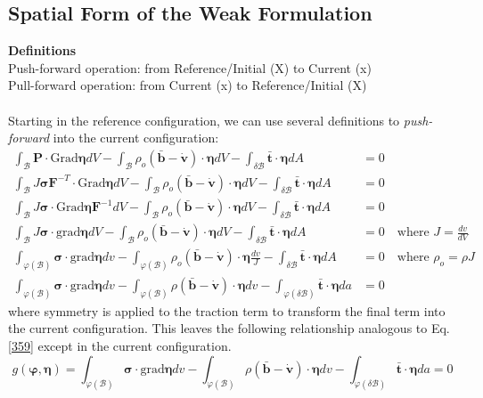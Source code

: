 \documentclass[12pt,3p]{article}
\numberwithin{equation}{section}
\begin{document}
\subsection{Spatial Form of the Weak Formulation}
\textbf{Definitions} \\ 
Push-forward operation: from Reference/Initial (X) to Current (x) \\
Pull-forward operation: from Current (x) to Reference/Initial (X) \\ \\
Starting in the reference configuration, we can use several definitions to \textit{push-forward} into the current configuration: 
\begin{align*}
\int_{\mathcal{B}} \mathbf{P} \cdot \text{Grad} \pmb{\eta} dV - \int_{\mathcal{B}} \rho_o (\mathbf{\bar{b}} - \mathbf{\dot{v}}) \cdot \pmb{\eta} dV - \int_{\delta \mathcal{B}} \mathbf{\bar{t}} \cdot \pmb{\eta} dA &= 0 \\
\int_{\mathcal{B}} J \pmb{\sigma} \mathbf{F}^{-T} \cdot \text{Grad} \pmb{\eta} dV - \int_{\mathcal{B}} \rho_o (\mathbf{\bar{b}} - \mathbf{\dot{v}}) \cdot \pmb{\eta} dV - \int_{\delta \mathcal{B}} \mathbf{\bar{t}} \cdot \pmb{\eta} dA &= 0 \\
\int_{\mathcal{B}} J \pmb{\sigma} \cdot \text{Grad} \pmb{\eta} \mathbf{F}^{-1} dV - \int_{\mathcal{B}} \rho_o (\mathbf{\bar{b}} - \mathbf{\dot{v}}) \cdot \pmb{\eta} dV - \int_{\delta \mathcal{B}} \mathbf{\bar{t}} \cdot \pmb{\eta} dA &= 0 \\
\int_{\mathcal{B}} J \pmb{\sigma} \cdot \text{grad} \pmb{\eta} dV - \int_{\mathcal{B}} \rho_o (\mathbf{\bar{b}} - \mathbf{\dot{v}}) \cdot \pmb{\eta} dV - \int_{\delta \mathcal{B}} \mathbf{\bar{t}} \cdot \pmb{\eta} dA &= 0 \quad \text{where } J = \frac{dv}{dV} \\
\int_{\varphi(\mathcal{B})} \pmb{\sigma} \cdot \text{grad} \pmb{\eta} dv - \int_{\varphi(\mathcal{B})} \rho_o (\mathbf{\bar{b}} - \mathbf{\dot{v}}) \cdot \pmb{\eta} \frac{dv}{J} - \int_{\delta \mathcal{B}} \mathbf{\bar{t}} \cdot \pmb{\eta} dA &= 0 \quad \text{where } \rho_o = \rho J \\
\int_{\varphi(\mathcal{B})} \pmb{\sigma} \cdot \text{grad} \pmb{\eta} dv - \int_{\varphi(\mathcal{B})} \rho (\mathbf{\bar{b}} - \mathbf{\dot{v}}) \cdot \pmb{\eta} dv - \int_{\varphi (\delta \mathcal{B})} \mathbf{\bar{t}} \cdot \pmb{\eta} da &= 0
\end{align*}
where symmetry is applied to the traction term to transform the final term into the current configuration. This leaves the following relationship analogous to Eq. \ref{359} except in the current configuration. 
\begin{equation}\label{363}
g(\pmb{\varphi}, \pmb{\eta}) = \int_{\varphi(\mathcal{B})} \pmb{\sigma} \cdot \text{grad} \pmb{\eta} dv - \int_{\varphi(\mathcal{B})} \rho (\mathbf{\bar{b}} - \mathbf{\dot{v}}) \cdot \pmb{\eta} dv - \int_{\varphi (\delta \mathcal{B})} \mathbf{\bar{t}} \cdot \pmb{\eta} da = 0
\end{equation}
\end{document}
